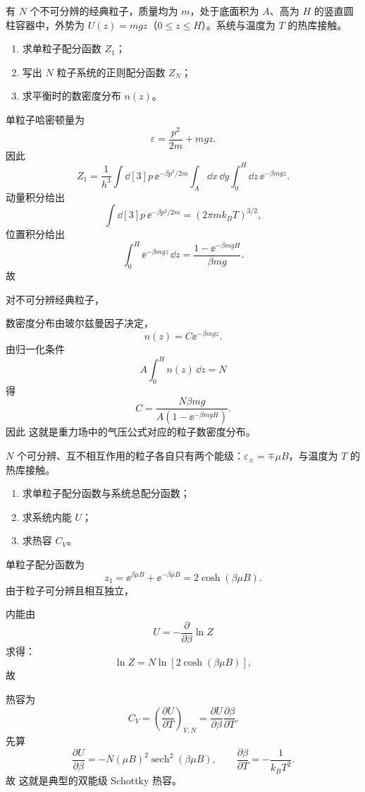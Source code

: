 \begin{question}
有 $N$ 个不可分辨的经典粒子，质量均为 $m$，处于底面积为 $A$、高为 $H$ 的竖直圆柱容器中，外势为 $U(z)=mgz$（$0\le z\le H$）。系统与温度为 $T$ 的热库接触。

\begin{enumerate}[label=(\arabic*),leftmargin=2.5em]
  \item 求单粒子配分函数 $Z_1$；
  \item 写出 $N$ 粒子系统的正则配分函数 $Z_N$；
  \item 求平衡时的数密度分布 $n(z)$。
\end{enumerate}

\begin{solution}
单粒子哈密顿量为
\[
\varepsilon=\frac{p^2}{2m}+mgz.
\]
因此
\[
Z_1=\frac{1}{h^3}\int \dd[3]{p}\,\ee^{-\beta p^2/2m}\int_A \dd{x}\,\dd{y}\int_0^H \dd{z}\,\ee^{-\beta mgz}.
\]
动量积分给出
\[
\int \dd[3]{p}\,\ee^{-\beta p^2/2m}=(2\pi m k_B T)^{3/2},
\]
位置积分给出
\[
\int_0^H \ee^{-\beta mgz}\,\dd{z}=\frac{1-\ee^{-\beta mgH}}{\beta mg}.
\]
故

对不可分辨经典粒子，

数密度分布由玻尔兹曼因子决定，
\[
n(z)=C \ee^{-\beta mgz}.
\]
由归一化条件
\[
A\int_0^H n(z)\,\dd{z}=N
\]
得
\[
C=\frac{N\beta mg}{A(1-\ee^{-\beta mgH})}.
\]
因此
这就是重力场中的气压公式对应的粒子数密度分布。
\end{solution}
\end{question}
\begin{question}
$N$ 个可分辨、互不相互作用的粒子各自只有两个能级：$\varepsilon_{\pm}=\mp \mu B$，与温度为 $T$ 的热库接触。

\begin{enumerate}[label=(\arabic*),leftmargin=2.5em]
  \item 求单粒子配分函数与系统总配分函数；
  \item 求系统内能 $U$；
  \item 求热容 $C_V$。
\end{enumerate}

\begin{solution}
单粒子配分函数为
\[
z_1=\ee^{\beta \mu B}+\ee^{-\beta \mu B}=2\cosh(\beta\mu B).
\]
由于粒子可分辨且相互独立，

内能由
\[
U=-\frac{\partial}{\partial\beta}\ln Z
\]
求得：
\[
\ln Z=N\ln[2\cosh(\beta\mu B)],
\]
故


热容为
\[
C_V=\left(\frac{\partial U}{\partial T}\right)_{V,N}
=
\frac{\partial U}{\partial \beta}\frac{\partial \beta}{\partial T}.
\]
先算
\[
\frac{\partial U}{\partial\beta}
=-N(\mu B)^2\operatorname{sech}^2(\beta\mu B),
\qquad
\frac{\partial\beta}{\partial T}=-\frac{1}{k_B T^2}.
\]
故
这就是典型的双能级 Schottky 热容。
\end{solution}
\end{question}
